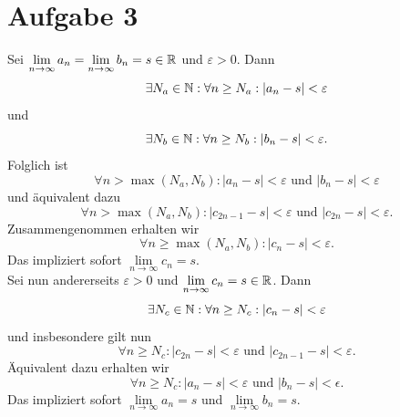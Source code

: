 \documentclass{article}
\newcommand{\mylim}{\lim\limits_{n\to \infty}}
\begin{document}
	\section*{Aufgabe 3}
	Sei $\mylim a_n = \mylim b_n = s\in \R$ und $\varepsilon > 0$. Dann
	$$\exists N_a\in \mathbb{N}: \forall n\geq N_a:|a_n-s| < \varepsilon$$ und
	$$\exists N_b\in \mathbb{N}: \forall n\geq N_b:|b_n-s| < \varepsilon.$$
	Folglich ist
	$$\forall n > \max(N_a, N_b): |a_n-s|< \varepsilon \text{ und } |b_n-s| <\varepsilon$$ und äquivalent dazu
	$$\forall n > \max(N_a, N_b): |c_{2n-1}-s|< \varepsilon \text{ und } |c_{2n}-s| <\varepsilon.$$
	Zusammengenommen erhalten wir
	$$\forall n\geq \max(N_a, N_b): |c_n-s|< \varepsilon.$$
	Das impliziert sofort $\mylim c_n = s$.\\
	Sei nun andererseits $\varepsilon > 0$ und $\mylim c_n = s\in \R$.
	Dann $$\exists N_c\in \mathbb{N}: \forall n\geq N_c: |c_n-s|< \varepsilon$$ und insbesondere gilt nun $$\forall n\geq N_c: |c_{2n}-s|< \varepsilon\text{ und }|c_{2n-1}-s| < \varepsilon.$$ Äquivalent dazu erhalten wir
	$$\forall n\geq N_c: |a_n-s|< \varepsilon \text{ und } |b_n-s|<\epsilon.$$
	Das impliziert sofort $\mylim a_n = s$ und $\mylim b_n = s$.
\end{document}
